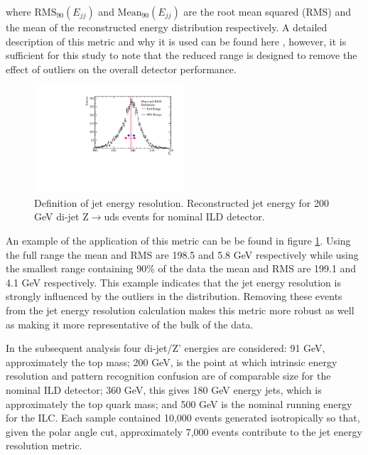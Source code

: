 where $\text{RMS}_{90}(E_{jj})$ and $\text{Mean}_{90}(E_{jj})$ are the root mean squared (RMS) and the mean of the reconstructed energy distribution respectively.  A detailed description of this metric and why it is used can be found here \cite{arXiv:0907.3577}, however, it is sufficient for this study to note that the reduced range is designed to remove the effect of outliers on the overall detector performance.  

\begin{figure}
\centering
\includegraphics[width=0.5\textwidth]{OptimisationStudies/Plots/MethodDescription/RMS90Plot.pdf}
\caption[Definition of jet energy resolution.   Reconstructed jet energy for 200 GeV di-jet Z$\rightarrow$uds events for nominal ILD detector.]{Definition of jet energy resolution.   Reconstructed jet energy for 200 GeV di-jet Z$\rightarrow$uds events for nominal ILD detector.}
\label{fig:rms90defintion}
\end{figure} 

An example of the application of this metric can be be found in figure \ref{fig:rms90defintion}.  Using the full range the mean and RMS are 198.5 and 5.8 GeV respectively while using the smallest range containing 90\% of the data the mean and RMS are 199.1 and 4.1 GeV respectively.  This example indicates that the jet energy resolution is strongly influenced by the outliers in the distribution.  Removing these events from the jet energy resolution calculation makes this metric more robust as well as making it more representative of the bulk of the data.

In the subsequent analysis four di-jet/Z' energies are considered: 91 GeV, approximately the top mass; 200 GeV, is the point at which intrinsic energy resolution and pattern recognition confusion are of comparable size for the nominal ILD detector; 360 GeV, this gives 180 GeV energy jets, which is approximately the top quark mass; and 500 GeV is the nominal running energy for the ILC.  Each sample contained 10,000 events generated isotropically so that, given the polar angle cut, approximately 7,000 events contribute to the jet energy resolution metric. 


